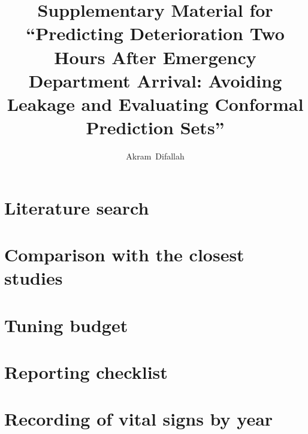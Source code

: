 

\usepackage{longtable}
\usepackage{array}
\usepackage{xr}

\let\origtable\table
\let\endorigtable\endtable
\renewenvironment{table}[1][]{\origtable[H]}{\endorigtable}

\onecolumn
\raggedbottom
\renewcommand{\thetable}{S\arabic{table}}
\renewcommand{\thefigure}{S\arabic{figure}}
\title{Supplementary Material for ``Predicting Deterioration Two Hours After Emergency Department Arrival: Avoiding Leakage and Evaluating Conformal Prediction Sets''}
\author{Akram~Difallah}
\maketitle

\section*{Literature search}


\section*{Comparison with the closest studies}


\section*{Tuning budget}


\clearpage
\clearpage
\section*{Reporting checklist}


\clearpage
\section*{Recording of vital signs by year}



